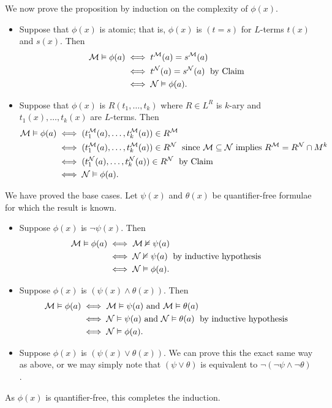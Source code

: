 \documentclass[10pt]{article}
\makeatletter
\theoremstyle{newstyle}
\newenvironment{pf}[1][\proofname]{\par
  \pushQED{\qed}%
  \normalfont \topsep0\p@\relax
  \trivlist
  \item[\hskip\labelsep\scshape
  #1\@addpunct{.}]\ignorespaces
}{%
  \popQED\endtrivlist\@endpefalse
}
\makeatother
\begin{document}
\begin{pf}
We now prove the proposition by induction on the complexity of $\phi(x)$.
\begin{itemize}
    \item Suppose that $\phi(x)$ is atomic; that is, $\phi(x)$ is $(t = s)$ for $L$-terms 
    $t(x)$ and $s(x)$. Then 
    \begin{align*}
        {\cal M} \vDash \phi(a) &\iff t^{\cal M}(a) = s^{\cal M}(a) \\ 
        &\iff t^{\cal N}(a) = s^{\cal N}(a) \; \text{ by Claim} \\ 
        &\iff {\cal N} \vDash \phi(a).
    \end{align*}
    \item Suppose that $\phi(x)$ is $R(t_1, \dots, t_k)$ where $R \in L^R$ is $k$-ary 
    and $t_1(x), \dots, t_k(x)$ are $L$-terms. Then 
    \begin{align*}
        {\cal M} \vDash \phi(a) &\iff (t_1^{\cal M}(a), \dots, t_k^{\cal M}(a)) \in R^{\cal M} \\ 
        &\iff (t_1^{\cal M}(a), \dots, t_k^{\cal M}(a)) \in R^{\cal N} \; \text{ since 
        ${\cal M \subseteq N}$ implies $R^{\cal M} = R^{\cal N} \cap M^k$} \\ 
        &\iff (t_1^{\cal N}(a), \dots, t_k^{\cal N}(a)) \in R^{\cal N} \; \text{ by Claim} \\ 
        &\iff {\cal N} \vDash \phi(a).
    \end{align*}
\end{itemize}
We have proved the base cases. Let $\psi(x)$ and $\theta(x)$ be 
quantifier-free formulae for which the result is known. 
\begin{itemize}
    \item Suppose $\phi(x)$ is $\neg \psi(x)$. Then 
    \begin{align*}
        {\cal M} \vDash \phi(a) &\iff {\cal M} \nvDash \psi(a) \\ 
        &\iff {\cal N} \nvDash \psi(a) \; \text{ by inductive hypothesis} \\ 
        &\iff {\cal N} \vDash \phi(a).
    \end{align*}
    \item Suppose $\phi(x)$ is $(\psi(x) \wedge \theta(x))$. Then 
    \begin{align*}
        {\cal M} \vDash \phi(a) &\iff {\cal M} \vDash \psi(a) \text{ and } {\cal M} \vDash \theta(a) \\ 
        &\iff {\cal N} \vDash \psi(a) \text{ and } {\cal N} \vDash \theta(a) \; \text{ by inductive hypothesis} \\ 
        &\iff {\cal N} \vDash \phi(a).
    \end{align*}
    \item Suppose $\phi(x)$ is $(\psi(x) \vee \theta(x))$. We can prove this the exact same 
    way as above, or we may simply note that $(\psi \vee \theta)$ is equivalent to 
    $\neg (\neg \psi \wedge \neg \theta)$.
\end{itemize}
As $\phi(x)$ is quantifier-free, this completes the induction. 
\end{pf}
\end{document}
